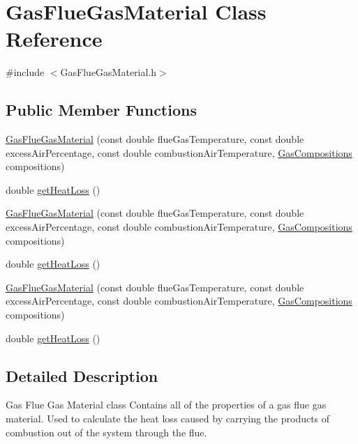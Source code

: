 \hypertarget{class_gas_flue_gas_material}{}\section{Gas\+Flue\+Gas\+Material Class Reference}
\label{class_gas_flue_gas_material}


{\ttfamily \#include $<$Gas\+Flue\+Gas\+Material.\+h$>$}

\subsection*{Public Member Functions}
\begin{DoxyCompactItemize}
\item 
\hyperlink{class_gas_flue_gas_material_a3e8b5eaf5b651f778ab8db86d5422618}{Gas\+Flue\+Gas\+Material} (const double flue\+Gas\+Temperature, const double excess\+Air\+Percentage, const double combustion\+Air\+Temperature, \hyperlink{class_gas_compositions}{Gas\+Compositions} compositions)
\item 
double \hyperlink{class_gas_flue_gas_material_ad9990d400536c6e8c7c53b9212de400b}{get\+Heat\+Loss} ()
\item 
\hyperlink{class_gas_flue_gas_material_a3e8b5eaf5b651f778ab8db86d5422618}{Gas\+Flue\+Gas\+Material} (const double flue\+Gas\+Temperature, const double excess\+Air\+Percentage, const double combustion\+Air\+Temperature, \hyperlink{class_gas_compositions}{Gas\+Compositions} compositions)
\item 
double \hyperlink{class_gas_flue_gas_material_ad9990d400536c6e8c7c53b9212de400b}{get\+Heat\+Loss} ()
\item 
\hyperlink{class_gas_flue_gas_material_a3e8b5eaf5b651f778ab8db86d5422618}{Gas\+Flue\+Gas\+Material} (const double flue\+Gas\+Temperature, const double excess\+Air\+Percentage, const double combustion\+Air\+Temperature, \hyperlink{class_gas_compositions}{Gas\+Compositions} compositions)
\item 
double \hyperlink{class_gas_flue_gas_material_ad9990d400536c6e8c7c53b9212de400b}{get\+Heat\+Loss} ()
\end{DoxyCompactItemize}


\subsection{Detailed Description}
Gas Flue Gas Material class Contains all of the properties of a gas flue gas material. Used to calculate the heat loss caused by carrying the products of combustion out of the system through the flue. 

